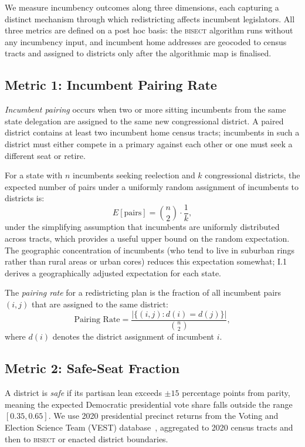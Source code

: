 \label{sec:methodology}

We measure incumbency outcomes along three dimensions, each capturing a distinct
mechanism through which redistricting affects incumbent legislators. All three metrics
are defined on a post hoc basis: the \textsc{bisect} algorithm runs without any
incumbency input, and incumbent home addresses are geocoded to census tracts and
assigned to districts only after the algorithmic map is finalised.

\subsection{Metric 1: Incumbent Pairing Rate}

\textit{Incumbent pairing} occurs when two or more sitting incumbents from the same
state delegation are assigned to the same new congressional district. A paired district
contains at least two incumbent home census tracts; incumbents in such a district must
either compete in a primary against each other or one must seek a different seat or retire.

For a state with $n$ incumbents seeking reelection and $k$ congressional districts,
the expected number of pairs under a uniformly random assignment of incumbents to
districts is:
\[
  E[\text{pairs}] = \binom{n}{2} \cdot \frac{1}{k},
\]
under the simplifying assumption that incumbents are uniformly distributed across
tracts, which provides a useful upper bound on the random expectation. The geographic
concentration of incumbents (who tend to live in suburban rings rather than rural areas
or urban cores) reduces this expectation somewhat; I.1 derives a geographically adjusted
expectation for each state.

The \textit{pairing rate} for a redistricting plan is the fraction of all incumbent
pairs $(i, j)$ that are assigned to the same district:
\[
  \text{Pairing Rate} = \frac{|\{(i,j) : d(i) = d(j)\}|}{\binom{n}{2}},
\]
where $d(i)$ denotes the district assignment of incumbent $i$.

\subsection{Metric 2: Safe-Seat Fraction}

A district is \textit{safe} if its partisan lean exceeds $\pm 15$ percentage points
from parity, meaning the expected Democratic presidential vote share falls outside the
range $[0.35, 0.65]$. We use 2020 presidential precinct returns from the Voting and
Election Science Team (VEST) database~\citep{vest2020}, aggregated to 2020 census
tracts and then to \textsc{bisect} or enacted district boundaries.

